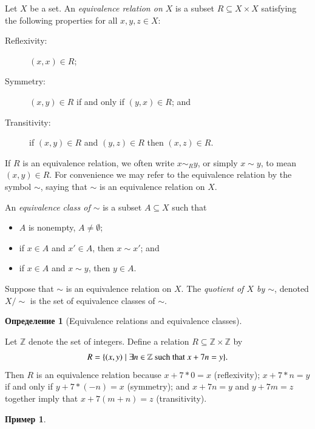 \documentclass[a4paper]{book}
\def\tn{\textnormal}
\def\ZZ{{\mathbb Z}}
\def\ss{\subseteq}
\def\|{{\;|\;}}
\theoremstyle{myth}
\newtheorem{exampleENG}[envENG]{\begin{english}Example\end{english}}
\newtheorem{definitionENG}[envENG]{\begin{english}Definition\end{english}}
\newtheorem{exampleRUS}[envRUS]{Пример}
\newtheorem{definitionRUS}[envRUS]{Определение}
\begin{document}
\begin{russian}
\begin{definitionENG}
Let $X$ be a set. An {\em equivalence relation on $X$} is a subset $R\ss X\times X$ satisfying the following properties for all $x,y,z\in X$:
\begin{description}
\item[Reflexivity:] $(x,x)\in R$;
\item[Symmetry:] $(x,y)\in R$ if and only if $(y,x)\in R$; and
\item[Transitivity:] if $(x,y)\in R$ and $(y,z)\in R$ then $(x,z)\in R$.
\end{description}
If $R$ is an equivalence relation, we often write $x\sim_R y$, or simply $x\sim y$, to mean $(x,y)\in R$. For convenience we may refer to the equivalence relation by the symbol $\sim$, saying that $\sim$ is an equivalence relation on $X$.

An {\em equivalence class of $\sim$} is a subset $A\ss X$ such that
\begin{itemize}
\item $A$ is nonempty, $A\neq\emptyset$;
\item if $x\in A$ and $x'\in A$, then $x\sim x'$; and 
\item if $x\in A$ and $x\sim y$, then $y\in A$.
\end{itemize}
Suppose that $\sim$ is an equivalence relation on $X$. The {\em quotient of $X$ by $\sim$}, denoted $X/\sim$ is the set of equivalence classes of $\sim$.
\end{definitionENG}

\begin{definitionRUS}[Equivalence relations and equivalence classes]
 
\end{definitionRUS}

\begin{exampleENG}
Let $\ZZ$ denote the set of integers. Define a relation $R\ss\ZZ\times\ZZ$ by $$R=\{(x,y)\|\exists n\in\ZZ \tn{ such that } x+7n=y\}.$$ Then $R$ is an equivalence relation because $x+7*0=x$ (reflexivity); $x+7*n=y$ if and only if $y+7*(-n)= x$ (symmetry); and $x+7n=y$ and $y+7m=z$ together imply that $x+7(m+n)=z$ (transitivity).
\end{exampleENG}

\begin{exampleRUS}
 

\end{exampleRUS}
\end{russian}
\end{document}

